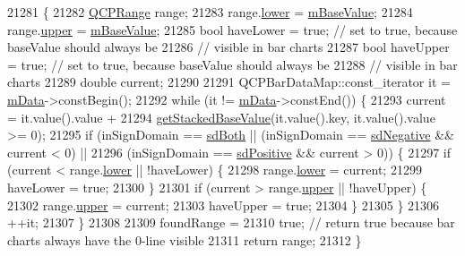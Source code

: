\begin{DoxyCode}
21281                                                                \{
21282   \hyperlink{class_q_c_p_range}{QCPRange} range;
21283   range.\hyperlink{class_q_c_p_range_aa3aca3edb14f7ca0c85d912647b91745}{lower} = \hyperlink{class_q_c_p_bars_aa0515cf47fa6044cc28e59b1ae5ec759}{mBaseValue};
21284   range.\hyperlink{class_q_c_p_range_ae44eb3aafe1d0e2ed34b499b6d2e074f}{upper} = \hyperlink{class_q_c_p_bars_aa0515cf47fa6044cc28e59b1ae5ec759}{mBaseValue};
21285   \textcolor{keywordtype}{bool} haveLower = \textcolor{keyword}{true}; \textcolor{comment}{// set to true, because baseValue should always be}
21286                          \textcolor{comment}{// visible in bar charts}
21287   \textcolor{keywordtype}{bool} haveUpper = \textcolor{keyword}{true}; \textcolor{comment}{// set to true, because baseValue should always be}
21288                          \textcolor{comment}{// visible in bar charts}
21289   \textcolor{keywordtype}{double} current;
21290 
21291   QCPBarDataMap::const\_iterator it = \hyperlink{class_q_c_p_bars_aef28d29d51ef84b608ecd22c55d531ff}{mData}->constBegin();
21292   \textcolor{keywordflow}{while} (it != \hyperlink{class_q_c_p_bars_aef28d29d51ef84b608ecd22c55d531ff}{mData}->constEnd()) \{
21293     current = it.value().value +
21294               \hyperlink{class_q_c_p_bars_ae9b0c2fad9f29030c84bb6e62a4b605f}{getStackedBaseValue}(it.value().key, it.value().value >= 0);
21295     \textcolor{keywordflow}{if} (inSignDomain == \hyperlink{class_q_c_p_abstract_plottable_a661743478a1d3c09d28ec2711d7653d8a082b98cfb91a7363a3b5cd17b0c1cd60}{sdBoth} || (inSignDomain == \hyperlink{class_q_c_p_abstract_plottable_a661743478a1d3c09d28ec2711d7653d8a0fc9a70796ef60ad18ddd18056e6dc63}{sdNegative} && current < 0) ||
21296         (inSignDomain == \hyperlink{class_q_c_p_abstract_plottable_a661743478a1d3c09d28ec2711d7653d8a02951859f243a4d24e779cfbb5471030}{sdPositive} && current > 0)) \{
21297       \textcolor{keywordflow}{if} (current < range.\hyperlink{class_q_c_p_range_aa3aca3edb14f7ca0c85d912647b91745}{lower} || !haveLower) \{
21298         range.\hyperlink{class_q_c_p_range_aa3aca3edb14f7ca0c85d912647b91745}{lower} = current;
21299         haveLower = \textcolor{keyword}{true};
21300       \}
21301       \textcolor{keywordflow}{if} (current > range.\hyperlink{class_q_c_p_range_ae44eb3aafe1d0e2ed34b499b6d2e074f}{upper} || !haveUpper) \{
21302         range.\hyperlink{class_q_c_p_range_ae44eb3aafe1d0e2ed34b499b6d2e074f}{upper} = current;
21303         haveUpper = \textcolor{keyword}{true};
21304       \}
21305     \}
21306     ++it;
21307   \}
21308 
21309   foundRange =
21310       \textcolor{keyword}{true}; \textcolor{comment}{// return true because bar charts always have the 0-line visible}
21311   \textcolor{keywordflow}{return} range;
21312 \}
\end{DoxyCode}


